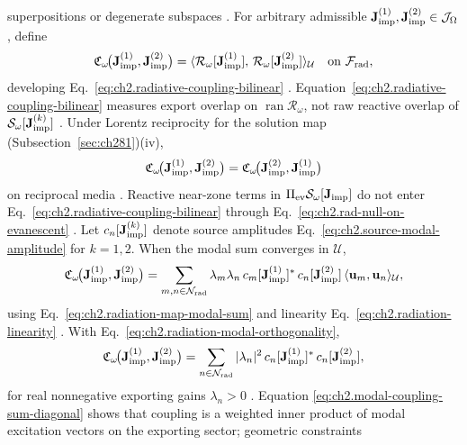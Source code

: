 superpositions or degenerate subspaces \cite{harrington2001}.
For arbitrary admissible \(\mathbf{J}_{\mathrm{imp}}^{(1)},\mathbf{J}_{\mathrm{imp}}^{(2)}\in\mathcal{J}_\Omega\), define
\begin{equation}
\label{eq:ch2.radiative-coupling-bilinear}
\mathfrak{C}_\omega\!\big(\mathbf{J}_{\mathrm{imp}}^{(1)},\mathbf{J}_{\mathrm{imp}}^{(2)}\big)
=
\langle \mathcal{R}_\omega[\mathbf{J}_{\mathrm{imp}}^{(1)}],\,\mathcal{R}_\omega[\mathbf{J}_{\mathrm{imp}}^{(2)}]\rangle_{\mathcal{U}}
\quad\text{on}\ \mathcal{F}_{\mathrm{rad}},
\end{equation}
developing Eq.~\eqref{eq:ch2.radiative-coupling-bilinear}
\cite{stratton1941}. Equation~\eqref{eq:ch2.radiative-coupling-bilinear}
measures export overlap on \(\operatorname{ran}\mathcal{R}_\omega\), not raw reactive overlap
of \(\mathcal{S}_\omega[\mathbf{J}_{\mathrm{imp}}^{(k)}]\) \cite{stratton1941}. Under Lorentz reciprocity for the solution map (Subsection~\ref{sec:ch281})(iv),
\begin{equation}
\label{eq:ch2.coupling-bilinear-symmetry}
\mathfrak{C}_\omega\!\big(\mathbf{J}_{\mathrm{imp}}^{(1)},\mathbf{J}_{\mathrm{imp}}^{(2)}\big)
=
\mathfrak{C}_\omega\!\big(\mathbf{J}_{\mathrm{imp}}^{(2)},\mathbf{J}_{\mathrm{imp}}^{(1)}\big)
\end{equation}
on reciprocal media \cite{stratton1941}. Reactive near-zone terms in
\(\Pi_{\mathrm{ev}}\mathcal{S}_\omega[\mathbf{J}_{\mathrm{imp}}]\) do not enter
Eq.~\eqref{eq:ch2.radiative-coupling-bilinear} through
Eq.~\eqref{eq:ch2.rad-null-on-evanescent} \cite{stratton1941}.
Let \(c_n[\mathbf{J}_{\mathrm{imp}}^{(k)}]\) denote source amplitudes Eq.~\eqref{eq:ch2.source-modal-amplitude}
for \(k=1,2\). When the modal sum converges in \(\mathcal{U}\),
\begin{equation}
\label{eq:ch2.modal-coupling-sum}
\mathfrak{C}_\omega\!\big(\mathbf{J}_{\mathrm{imp}}^{(1)},\mathbf{J}_{\mathrm{imp}}^{(2)}\big)
=
\sum_{m,n\in\mathcal{N}_{\mathrm{rad}}}
\lambda_m\lambda_n\,
c_m[\mathbf{J}_{\mathrm{imp}}^{(1)}]^{*}\,
c_n[\mathbf{J}_{\mathrm{imp}}^{(2)}]\,
\langle \mathbf{u}_m,\mathbf{u}_n\rangle_{\mathcal{U}},
\end{equation}
using Eq.~\eqref{eq:ch2.radiation-map-modal-sum} and linearity
Eq.~\eqref{eq:ch2.radiation-linearity} \cite{stratton1941}. With
Eq.~\eqref{eq:ch2.radiation-modal-orthogonality},
\begin{equation}
\label{eq:ch2.modal-coupling-sum-diagonal}
\mathfrak{C}_\omega\!\big(\mathbf{J}_{\mathrm{imp}}^{(1)},\mathbf{J}_{\mathrm{imp}}^{(2)}\big)
=
\sum_{n\in\mathcal{N}_{\mathrm{rad}}}
|\lambda_n|^{2}\,
c_n[\mathbf{J}_{\mathrm{imp}}^{(1)}]^{*}\,
c_n[\mathbf{J}_{\mathrm{imp}}^{(2)}],
\end{equation}
for real nonnegative exporting gains \(\lambda_n>0\) \cite{stratton1941}. Equation
\eqref{eq:ch2.modal-coupling-sum-diagonal} shows that coupling is a weighted inner product
of modal excitation vectors on the exporting sector; geometric constraints
